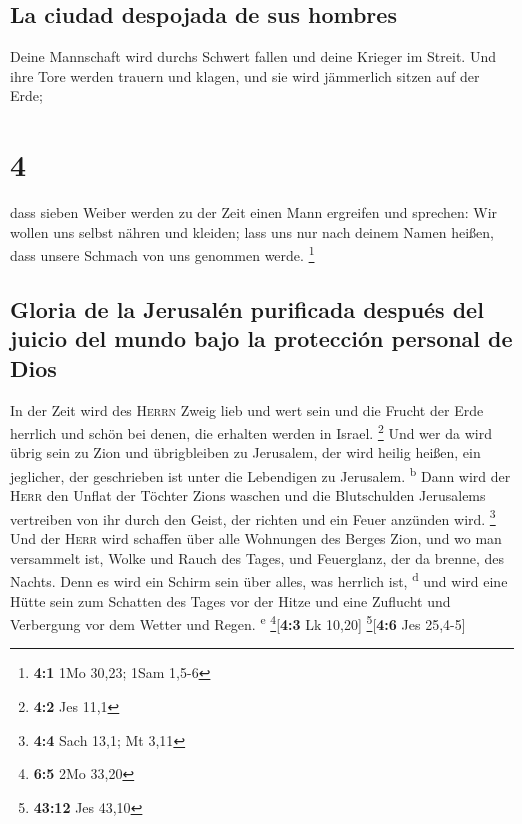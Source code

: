 \hypertarget{la-ciudad-despojada-de-sus-hombres}{%
\subsection{La ciudad despojada de sus
hombres}\label{la-ciudad-despojada-de-sus-hombres}}

 Deine Mannschaft wird durchs Schwert fallen und deine
Krieger im Streit.  Und ihre Tore werden trauern und
klagen, und sie wird jämmerlich sitzen auf der Erde;

\hypertarget{section-3}{%
\section{4}\label{section-3}}

 dass sieben Weiber werden zu der Zeit einen Mann
ergreifen und sprechen: Wir wollen uns selbst nähren und kleiden; lass
uns nur nach deinem Namen heißen, dass unsere Schmach von uns genommen
werde. \footnote{\textbf{4:1} 1Mo 30,23; 1Sam 1,5-6}

\hypertarget{gloria-de-la-jerusaluxe9n-purificada-despuuxe9s-del-juicio-del-mundo-bajo-la-protecciuxf3n-personal-de-dios}{%
\subsection{Gloria de la Jerusalén purificada después del juicio del
mundo bajo la protección personal de
Dios}\label{gloria-de-la-jerusaluxe9n-purificada-despuuxe9s-del-juicio-del-mundo-bajo-la-protecciuxf3n-personal-de-dios}}

 In der Zeit wird des \textsc{Herrn} Zweig lieb und wert
sein und die Frucht der Erde herrlich und schön bei denen, die erhalten
werden in Israel. \footnote{\textbf{4:2} Jes 11,1}  Und
wer da wird übrig sein zu Zion und übrigbleiben zu Jerusalem, der wird
heilig heißen, ein jeglicher, der geschrieben ist unter die Lebendigen
zu Jerusalem. \textsuperscript{b}  Dann wird der
\textsc{Herr} den Unflat der Töchter Zions waschen und die Blutschulden
Jerusalems vertreiben von ihr durch den Geist, der richten und ein Feuer
anzünden wird. \footnote{\textbf{4:4} Sach 13,1; Mt 3,11} 
Und der \textsc{Herr} wird schaffen über alle Wohnungen des Berges Zion,
und wo man versammelt ist, Wolke und Rauch des Tages, und Feuerglanz,
der da brenne, des Nachts. Denn es wird ein Schirm sein über alles, was
herrlich ist, \textsuperscript{d}  und wird eine Hütte
sein zum Schatten des Tages vor der Hitze und eine Zuflucht und
Verbergung vor dem Wetter und Regen. \textsuperscript{e}
\footnote{\textbf{6:5} 2Mo 33,20}{[}\textbf{4:3} Lk 10,20{]}
\footnote{\textbf{43:12} Jes 43,10}{[}\textbf{4:6} Jes 25,4-5{]}

